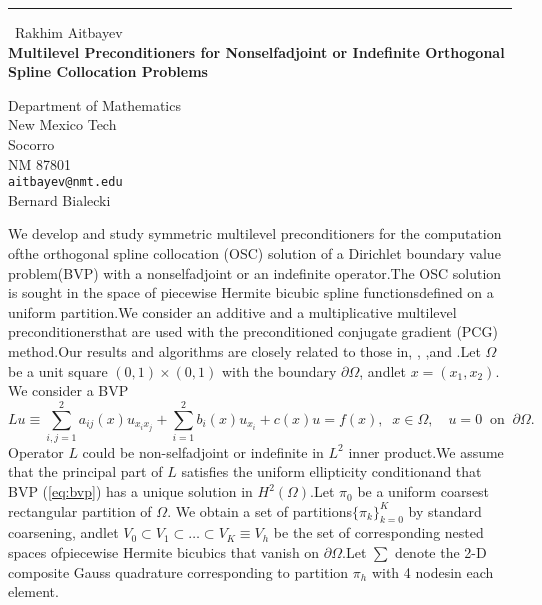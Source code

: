 \documentclass{report}
\begin{document}
\begin{center}
\rule{6in}{1pt} \
{\large Rakhim Aitbayev \\
{\bf Multilevel Preconditioners for Nonselfadjoint or Indefinite Orthogonal Spline Collocation Problems}}

Department of Mathematics \\ New Mexico Tech \\ Socorro \\ NM 87801
\\
{\tt aitbayev@nmt.edu}\\
Bernard Bialecki\end{center}

\newtheorem*{theorem}{Theorem}\newcommand{\GP}{\mbox{${\cal G}$}}\newcommand{\SH}{\mbox{$\scriptscriptstyle H^{2}(\Omega)$}}\newcommand{\SL}{\mbox{$\scriptscriptstyle L^{2}(\Omega)$}}We develop and study symmetric multilevel preconditioners for the computation ofthe orthogonal spline collocation (OSC) solution of a Dirichlet boundary value problem(BVP) with a nonselfadjoint or an indefinite operator.The OSC solution is sought in the space of piecewise Hermite bicubic spline functionsdefined on a uniform partition.We consider an additive and a multiplicative multilevel preconditionersthat are used with the preconditioned conjugate gradient (PCG) method.Our results and algorithms are closely related to those in\cite{Aitbayev_Bialecki_2003},
\cite{Bialecki_1998},
\cite{Bialecki_Dryja_1997},and \cite{SBG_1996}.Let $\Omega$ be a unit square $(0,1)\times(0,1)$ with the boundary $\partial\Omega$,
andlet $x=(x_1,x_2)$.
We consider a BVP\begin{equation}\label{eq:bvp}Lu\equiv\sum_{i,j=1}^{2} a_{ij}(x)u_{x_ix_j}+\sum_{i=1}^{2} b_i(x) u_{x_i}+c(x)u = f(x),\;\;x\in\Omega,\quad u=0 \;\;\mbox{on}\;\;\partial\Omega.\end{equation}Operator $L$ could be non-selfadjoint or indefinite in $L^2$ inner product.We assume that the principal part of $L$ satisfies the uniform ellipticity conditionand that BVP (\ref{eq:bvp}) has a unique solution in $H^2(\Omega)$.Let $\pi_0$ be a uniform coarsest rectangular partition of $\Omega$.
We obtain a set of partitions$\{\pi_k\}_{k=0}^{K}$ by standard coarsening,
andlet $V_0\subset V_1\subset\ldots\subset V_K\equiv V_h$ be the set of corresponding nested spaces ofpiecewise Hermite bicubics that vanish on $\partial\Omega$.Let $\sum$ denote the 2-D composite Gauss quadrature corresponding to partition $\pi_h$ with 4 nodesin each element.
\end{document}
